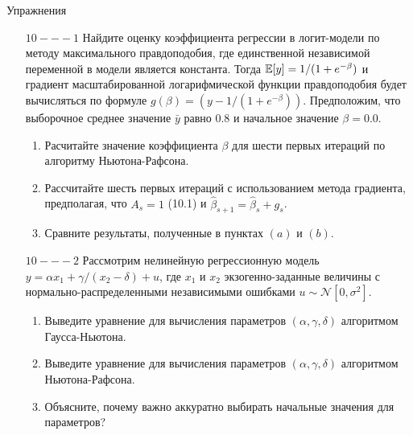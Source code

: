 \begin{center}
Упражнения
\end{center}

\begin{enumerate}
\item [$10 --- 1$] Найдите оценку коэффициента регрессии в логит-модели по методу максимального правдоподобия, где единственной независимой переменной в модели является константа. Тогда $\mathbb{E}[y]=1/(1+e^{-\beta})$ и градиент масштабированной логарифмической функции правдоподобия будет вычисляться по формуле $g(\beta)=(y-1/(1+e^{-\beta}))$. Предположим, что выборочное среднее значение $\bar{y}$ равно 0.8 и начальное значение $\beta=0.0$.
\begin{enumerate}
\item Расчитайте значение коэффициента $\beta$ для шести первых итераций по алгоритму Ньютона-Рафсона.
\item Рассчитайте шесть первых итераций с использованием метода градиента, предполагая, что $A_s=1$ (10.1) и $\hat{\beta}_{s+1}=\hat{\beta}_s+g_s$.
\item Сравните результаты, полученные в пунктах $(a)$ и $(b)$.
\end{enumerate}


\item [$10 --- 2$] Рассмотрим нелинейную регрессионную модель $y = \alpha{x_1}+\gamma/(x_2-\delta)+u$, где $x_1$ и $x_2$ экзогенно-заданные величины с нормально-распределенными независимыми ошибками $u \sim \mathcal{N}[0,\sigma^2]$.
\begin{enumerate}
\item Выведите уравнение для вычисления параметров $(\alpha, \gamma, \delta)$  алгоритмом Гаусса-Ньютона.
\item Выведите уравнение для вычисления параметров $(\alpha, \gamma, \delta)$ алгоритмом Ньютона-Рафсона.
\item Объясните, почему важно аккуратно выбирать начальные значения для параметров?
\end{enumerate}


\end{enumerate}
